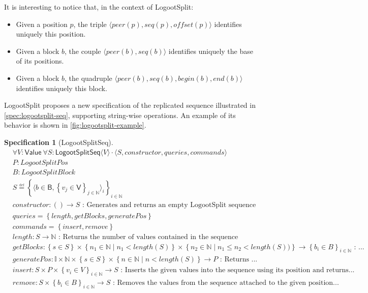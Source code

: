 \documentclass{article}
\newcommand{\commands}[1]{commands = \set{#1}}
\newcommand{\defeq}{\overset{\underset{\mathrm{def}}{}}{=}}
\newcommand{\fnspec}[3]{#1: #2 \text{ : #3}}
\newcommand{\inbb}[1]{\in \mathbb{#1}}
\newcommand{\mathlist}[2]{\set{#1_i \in #2}_{i \inbb{N}}}
\newcommand{\queries}[1]{queries = \set{#1}}
\newcommand{\set}[1]{\left\{#1\right\}} %
\newcommand{\spectuple}[1]{\tuple{#1, constructor, queries, commands}}
\newcommand{\ssep}{\mid} %
\newcommand{\tuple}[1]{\langle #1 \rangle}
\theoremstyle{definition}
\newtheorem{specification}{Specification}
\begin{document}
It is interesting to notice that, in the context of LogootSplit:
\begin{itemize}
    \item Given a position $p$, the triple $\tuple{peer(p), seq(p), offset(p)}$ identifies uniquely this position.
    \item Given a block $b$, the couple $\tuple{peer(b), seq(b)}$ identifies uniquely the base of its positions.
    \item Given a block $b$, the quadruple $\tuple{peer(b), seq(b), begin(b), end(b)}$ identifies uniquely this block.
\end{itemize}

LogootSplit proposes a new specification of the replicated sequence illustrated in \autoref{spec:logootsplit-seq}, supporting string-wise operations. An example of its behavior is shown in \autoref{fig:logootsplit-example}.

\begin{specification}[LogootSplitSeq]
    \begin{align*}
    &\forall V: \mathsf{Value} \ \forall S: \mathsf{LogootSplitSeq} \tuple{V} \cdot \spectuple{S}\\
    &P: LogootSplitPos\\
    &B: LogootSplitBlock\\
    &S \defeq \set{\tuple{b \in \mathsf{B}, \set{v_j \in \mathsf{V}}_{j \inbb {N}}}_i}_{i \inbb{N}}\\
    &\fnspec{constructor}{\left( \right) \to S}{Generates and returns an empty LogootSplit sequence}\\
    &\queries{length, getBlocks, generatePos}\\
    &\commands{insert, remove}\\
    &\fnspec{length}{S \to \mathbb{N}}{Returns the number of values contained in the sequence}\\
    &\fnspec{getBlocks}{\set{s \in S} \times \set{n_1 \inbb{N} \ssep n_1 < length(S)} \times \set{n_2 \inbb{N} \ssep n_1 \leq n_2 < length(S))} \to \mathlist{b}{B}}{...}\\
    &\fnspec{generatePos}{\mathbb{I} \times \mathbb{N} \times \set{s \in S} \times \set{n \inbb{N} \ssep n < length(S)} \to P}{Returns ...}\\
    &\fnspec{insert}{S \times P \times \mathlist{v}{V} \to S}{Inserts the given values into the sequence using its position and returns...}\\
    &\fnspec{remove}{S \times \mathlist{b}{B} \to S}{Removes the values from the sequence attached to the given position...}
    \end{align*}
    \label{spec:logootsplit-seq}
\end{specification}
\end{document}
